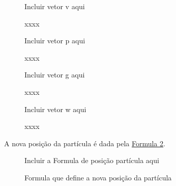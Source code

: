                 \begin{figure}[!htb]
                    \begin{minipage}{\textwidth}

                        \begin{minipage}{0.5\textwidth}
                            \centering
                            \small{Incluir vetor v aqui}
                            \caption{xxxx}
                            \label{fig:vetor-v}
                        \end{minipage}
                        \begin{minipage}{0.5\textwidth}
                            \centering
                            \small{Incluir vetor p aqui}
                            \caption{xxxx}
                            \label{fig:vetor-p}
                        \end{minipage}

                        \begin{minipage}{0.5\textwidth}
                            \centering
                            \small{Incluir vetor g aqui}
                            \caption{xxxx}
                            \label{fig:vetor-g}
                        \end{minipage}
                        \begin{minipage}{0.5\textwidth}
                            \centering
                            \small{Incluir vetor w aqui}
                            \caption{xxxx}
                            \label{fig:vetor-w}
                        \end{minipage}

                    \end{minipage}
                \end{figure}

                \noindent A nova posição da partícula é dada pela 
                \hyperref[fig:formula-nova-posicao]{Formula \ref{fig:formula-nova-posicao}}.
                
                \begin{figure}[h]
                    \centering
                    \small{Incluir a Formula de posição partícula aqui}
                    \caption{Formula que define a nova posição da partícula}
                    \label{fig:formula-nova-posicao}
                \end{figure}


